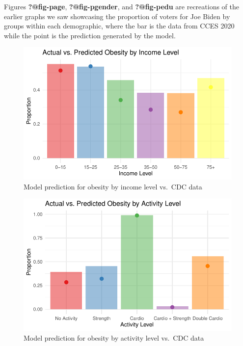 \documentclass[
  letterpaper,
  DIV=11,
  numbers=noendperiod]{scrartcl}
\begin{document}
Figures \textbf{?@fig-page}, \textbf{?@fig-pgender}, and
\textbf{?@fig-pedu} are recreations of the earlier graphs we saw
showcasing the proportion of voters for Joe Biden by groups within each
demographic, where the bar is the data from CCES 2020 while the point is
the prediction generated by the model.

\begin{figure}

{\centering \includegraphics[width=\textwidth,height=0.25\textheight]{paper_files/figure-pdf/fig-pactivity-1.pdf}

}

\caption{\label{fig-pactivity}Model prediction for obesity by income
level vs.~CDC data}

\end{figure}

\begin{figure}

{\centering \includegraphics[width=\textwidth,height=0.25\textheight]{paper_files/figure-pdf/fig-pobesity-1.pdf}

}

\caption{\label{fig-pobesity}Model prediction for obesity by activity
level vs.~CDC data}

\end{figure}
\end{document}
